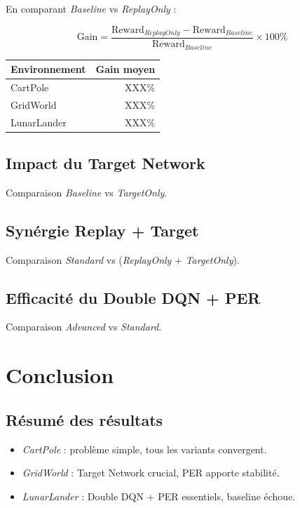 \documentclass[12pt,a4paper]{article}
\begin{document}
En comparant \textit{Baseline} vs \textit{ReplayOnly} :

\[
\text{Gain} = \frac{\text{Reward}_{ReplayOnly} - \text{Reward}_{Baseline}}{\text{Reward}_{Baseline}} \times 100\%
\]

\begin{center}
\begin{tabular}{|l|r|}
\hline
\textbf{Environnement} & \textbf{Gain moyen} \\
\hline
CartPole & XXX\% \\
GridWorld & XXX\% \\
LunarLander & XXX\% \\
\hline
\end{tabular}
\end{center}

\subsection{Impact du Target Network}

Comparaison \textit{Baseline} vs \textit{TargetOnly}.

\subsection{Synérgie Replay + Target}

Comparaison \textit{Standard} vs (\textit{ReplayOnly} + \textit{TargetOnly}).

\subsection{Efficacité du Double DQN + PER}

Comparaison \textit{Advanced} vs \textit{Standard}.

\section{Conclusion}

\subsection{Résumé des résultats}

\begin{itemize}
    \item \textit{CartPole} : problème simple, tous les variants convergent.
    \item \textit{GridWorld} : Target Network crucial, PER apporte stabilité.
    \item \textit{LunarLander} : Double DQN + PER essentiels, baseline échoue.
\end{itemize}
\end{document}
